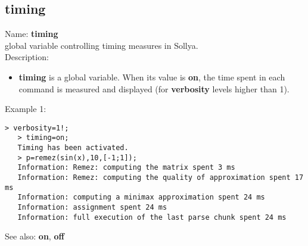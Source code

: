 \subsection{ timing }
\noindent Name: \textbf{timing}\\
global variable controlling timing measures in Sollya.\\

\noindent Description: \begin{itemize}

\item \textbf{timing} is a global variable. When its value is \textbf{on}, the time spent in each 
   command is measured and displayed (for \textbf{verbosity} levels higher than 1).
\end{itemize}
\noindent Example 1: 
\begin{center}\begin{minipage}{14.8cm}\begin{Verbatim}[frame=single]
   > verbosity=1!;
   > timing=on;
   Timing has been activated.
   > p=remez(sin(x),10,[-1;1]);
   Information: Remez: computing the matrix spent 3 ms
   Information: Remez: computing the quality of approximation spent 17 ms
   Information: computing a minimax approximation spent 24 ms
   Information: assignment spent 24 ms
   Information: full execution of the last parse chunk spent 24 ms
\end{Verbatim}
\end{minipage}\end{center}
See also: \textbf{on}, \textbf{off}
